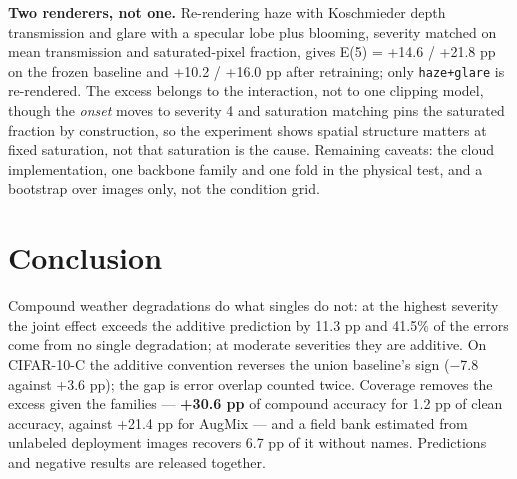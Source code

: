\textbf{Two renderers, not one.} Re-rendering haze with Koschmieder depth transmission and glare with a specular lobe plus blooming, severity matched on mean transmission and saturated-pixel fraction, gives E(5) = +14.6 / +21.8 pp on the frozen baseline and +10.2 / +16.0 pp after retraining; only \texttt{haze+glare} is re-rendered. The excess belongs to the interaction, not to one clipping model, though the \emph{onset} moves to severity 4 and saturation matching pins the saturated fraction by construction, so the experiment shows spatial structure matters at fixed saturation, not that saturation is the cause. Remaining caveats: the cloud implementation, one backbone family and one fold in the physical test, and a bootstrap over images only, not the condition grid.

\section{Conclusion}
Compound weather degradations do what singles do not: at the highest severity the joint effect exceeds the additive prediction by 11.3 pp and 41.5\% of the errors come from no single degradation; at moderate severities they are additive. On CIFAR-10-C the additive convention reverses the union baseline's sign ($-$7.8 against +3.6 pp); the gap is error overlap counted twice. Coverage removes the excess given the families --- \textbf{+30.6 pp} of compound accuracy for 1.2 pp of clean accuracy, against +21.4 pp for AugMix --- and a field bank estimated from unlabeled deployment images recovers 6.7 pp of it without names. Predictions and negative results are released together.


